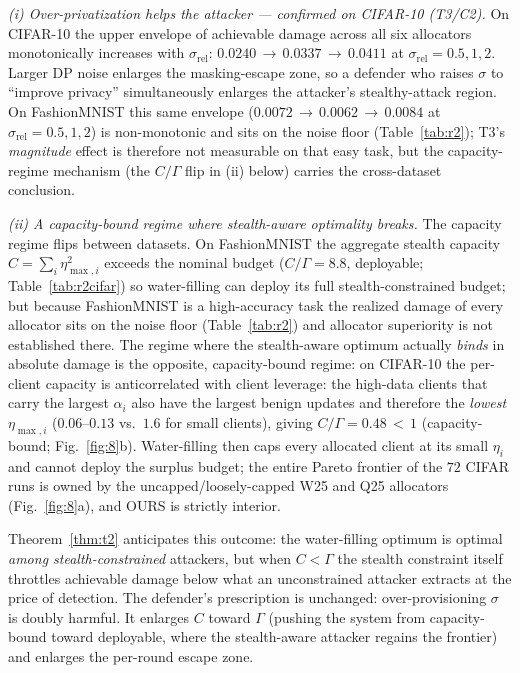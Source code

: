 \documentclass[final,1p,times]{elsarticle}
\begin{document}
\emph{(i) Over-privatization helps the attacker --- confirmed on CIFAR-10 (T3/C2).}
On CIFAR-10 the upper envelope of achievable damage across all six
allocators monotonically increases with $\sigma_{\mathrm{rel}}$:
$0.0240\,{\to}\,0.0337\,{\to}\,0.0411$ at
$\sigma_{\mathrm{rel}}{=}0.5,1,2$. Larger DP noise enlarges the
masking-escape zone, so a defender who raises
$\sigma$ to ``improve privacy'' simultaneously enlarges the attacker's
stealthy-attack region. On FashionMNIST this same envelope
($0.0072\,{\to}\,0.0062\,{\to}\,0.0084$ at
$\sigma_{\mathrm{rel}}{=}0.5,1,2$) is non-monotonic and sits on the noise
floor (Table~\ref{tab:r2}); T3's \emph{magnitude} effect is therefore not
measurable on that easy task, but the capacity-regime mechanism (the
$C/\Gamma$ flip in (ii) below) carries the cross-dataset conclusion.

\emph{(ii) A capacity-bound regime where stealth-aware optimality breaks.}
The capacity regime flips between datasets. On FashionMNIST the aggregate
stealth capacity $C{=}\sum_i\eta_{\max,i}^2$ exceeds the nominal budget
($C/\Gamma{=}8.8$, deployable; Table~\ref{tab:r2cifar}) so water-filling
can deploy its full stealth-constrained budget; but because
FashionMNIST is a high-accuracy task the realized damage of every allocator
sits on the noise floor (Table~\ref{tab:r2}) and allocator superiority is
not established there. The regime where the stealth-aware optimum actually
\emph{binds} in absolute damage is the opposite, capacity-bound regime: on
CIFAR-10 the per-client capacity is anticorrelated with client
leverage: the high-data clients that carry the largest $\alpha_i$ also
have the largest benign updates and therefore the \emph{lowest}
$\eta_{\max,i}$ ($0.06$--$0.13$ vs.\ $1.6$ for small clients), giving
$C/\Gamma{=}0.48\,{<}\,1$ (capacity-bound; Fig.~\ref{fig:8}b). Water-filling then
caps every allocated client at its small $\eta_i$ and cannot deploy
the surplus budget; the entire Pareto frontier of the $72$ CIFAR runs is
owned by the uncapped/loosely-capped W25 and Q25 allocators (Fig.~\ref{fig:8}a),
and OURS is strictly interior.

Theorem~\ref{thm:t2} anticipates this outcome: the
water-filling optimum is optimal \emph{among
stealth-constrained} attackers, but when $C{<}\Gamma$ the stealth
constraint itself throttles achievable damage below what an unconstrained
attacker extracts at the price of detection. The defender's prescription
is unchanged: over-provisioning $\sigma$ is doubly harmful. It
enlarges $C$ toward $\Gamma$ (pushing the system from capacity-bound
toward deployable, where the stealth-aware attacker regains the frontier)
and enlarges the per-round escape zone.
\end{document}
